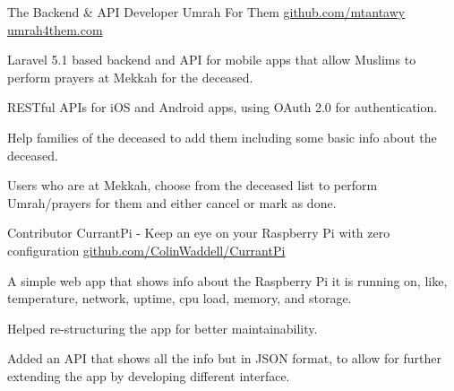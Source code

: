 


\begin{cventries}

  \cventry
    {The Backend \& API Developer} %
    {Umrah For Them} %
    {\href{https://github.com/mtantawy/UmrahForThemBackend} {github.com/mtantawy}} %
    {\href{http://umrah4them.com} {umrah4them.com}} %
    {
      \begin{cvitems} %
        \item {Laravel 5.1 based backend and API for mobile apps that allow Muslims to perform prayers at Mekkah for the deceased.}
        \item {RESTful APIs for iOS and Android apps, using OAuth 2.0 for authentication.}
        \item {Help families of the deceased to add them including some basic info about the deceased.}
        \item {Users who are at Mekkah, choose from the deceased list to perform Umrah/prayers for them and either cancel or mark as done.}
      \end{cvitems}
    }


  \cventry
    {Contributor} %
    {CurrantPi - Keep an eye on your Raspberry Pi with zero configuration} %
    {\href{http://github.com/ColinWaddell/CurrantPi} {github.com/ColinWaddell/CurrantPi}} %
    {} %
    {
      \begin{cvitems} %
        \item {A simple web app that shows info about the Raspberry Pi it is running on, like, temperature, network, uptime, cpu load, memory, and storage.}
        \item {Helped re-structuring the app for better maintainability.}
        \item {Added an API that shows all the info but in JSON format, to allow for further extending the app by developing different interface.}
      \end{cvitems}
    }



\end{cventries}
